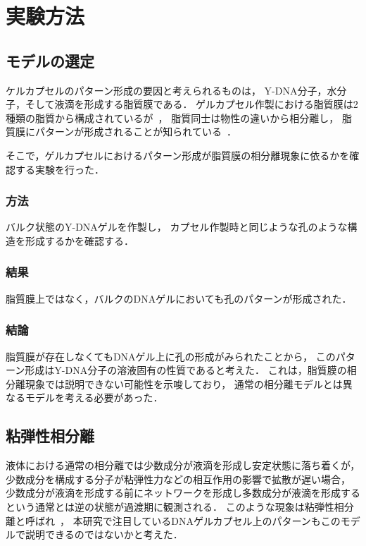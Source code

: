\chapter{実験方法}

\section{モデルの選定}
ケルカプセルのパターン形成の要因と考えられるものは，
Y-DNA分子，水分子，そして液滴を形成する脂質膜である．
ゲルカプセル作製における脂質膜は2種類の脂質から構成されているが~\cite{morita2017formation}，
脂質同士は物性の違いから相分離し，
脂質膜にパターンが形成されることが知られている~\cite{yanagisawa2014multiple}．

そこで，ゲルカプセルにおけるパターン形成が脂質膜の相分離現象に依るかを確認する実験を行った．

\subsection{方法}
バルク状態のY-DNAゲルを作製し，
カプセル作製時と同じような孔のような構造を形成するかを確認する．

\subsection{結果}
脂質膜上ではなく，バルクのDNAゲルにおいても孔のパターンが形成された．

\subsection{結論}
脂質膜が存在しなくてもDNAゲル上に孔の形成がみられたことから，
このパターン形成はY-DNA分子の溶液固有の性質であると考えた．
これは，脂質膜の相分離現象では説明できない可能性を示唆しており，
通常の相分離モデルとは異なるモデルを考える必要があった．

\section{粘弾性相分離}
液体における通常の相分離では少数成分が液滴を形成し安定状態に落ち着くが，
少数成分を構成する分子が粘弾性力などの相互作用の影響で拡散が遅い場合，
少数成分が液滴を形成する前にネットワークを形成し多数成分が液滴を形成するという通常とは逆の状態が過渡期に観測される．
このような現象は粘弾性相分離と呼ばれ~\cite{tanaka2009formation}，
本研究で注目しているDNAゲルカプセル上のパターンもこのモデルで説明できるのではないかと考えた．

